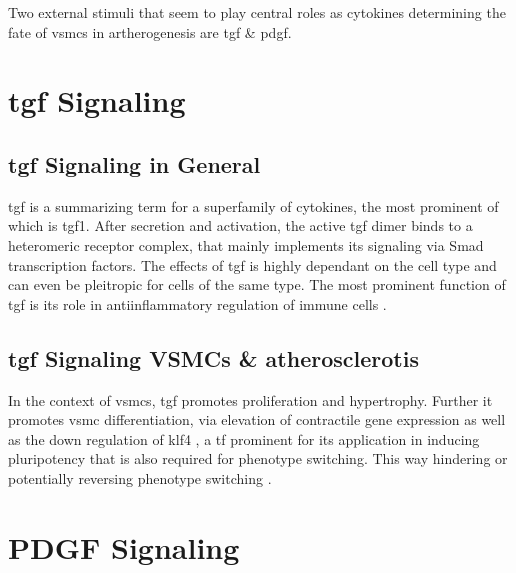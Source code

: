 Two external stimuli that seem to play central roles as cytokines determining the fate of \acp{vsmc} in artherogenesis are \ac{tgf} \& \ac{pdgf}.


\section{\ac{tgf} Signaling}
\label{sec:tgf}

    \subsection{\ac{tgf} Signaling in General}
    \label{subsec:tgf_the_cytokine}
    \ac{tgf} is a summarizing term for a superfamily of cytokines, the most prominent of which is \ac{tgf}1. After secretion and activation, the active \ac{tgf} dimer binds to a heteromeric receptor complex, that mainly implements its signaling via Smad transcription factors. The effects of \ac{tgf} is highly dependant on the cell type and can even be pleitropic for cells of the same type. The most prominent function of \ac{tgf} is its role in antiinflammatory regulation of immune cells \cite{goumansTGFvSignalingControl2018, batlleTransformingGrowthFactorv2019}.

    \subsection{\ac{tgf} Signaling VSMCs \& atherosclerotis}
    \label{subsec:pdf_signaling}
    In the context of \acp{vsmc}, \ac{tgf} promotes proliferation and hypertrophy. Further it promotes \ac{vsmc} differentiation, via elevation of contractile gene expression as well as the down regulation of \ac{klf4} \cite{davis-dusenberyDownregulationKruppellikeFactor42011}, a \ac{tf} prominent for its application in inducing pluripotency \cite{takahashiInductionPluripotentStem2007} that is also required for phenotype switching. This way hindering \cite{davis-dusenberyDownregulationKruppellikeFactor42011} or potentially reversing phenotype switching \cite{panSingleCellGenomicsReveals2020}.

\section{PDGF Signaling}
\label{sec:pdgf}
